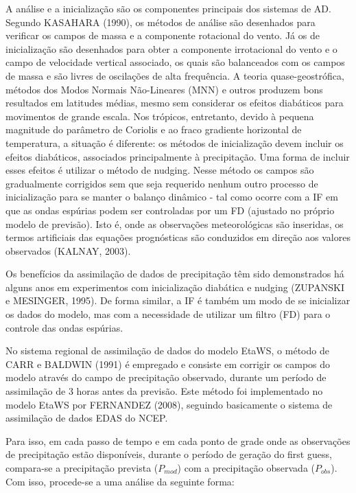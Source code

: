 A análise e a inicialização são os componentes principais dos sistemas de AD. Segundo KASAHARA (1990), os métodos de análise são desenhados para verificar os campos de massa e a componente rotacional do vento. Já os de inicialização são desenhados para obter a componente irrotacional do vento e o campo de velocidade vertical associado, os quais são balanceados com os campos de massa e são livres de oscilações de alta frequência. A teoria quase-geostrófica, métodos dos Modos Normais Não-Lineares (MNN) e outros produzem bons resultados em latitudes médias, mesmo sem considerar os efeitos diabáticos para movimentos de grande escala. Nos trópicos, entretanto, devido à pequena magnitude do parâmetro de Coriolis e ao fraco gradiente horizontal de temperatura, a situação é diferente: os métodos de inicialização devem incluir os efeitos diabáticos, associados principalmente à precipitação. Uma forma de incluir esses efeitos é utilizar o método de nudging. Nesse método os campos são gradualmente corrigidos sem que seja requerido nenhum outro processo de inicialização para se manter o balanço dinâmico - tal como ocorre com a IF em que as ondas espúrias podem ser controladas por um FD (ajustado no próprio modelo de previsão). Isto é, onde as observações meteorológicas são inseridas, os termos artificiais das equações prognósticas são conduzidos em direção aos valores observados (KALNAY, 2003). 

Os benefícios da assimilação de dados de precipitação têm sido demonstrados há alguns anos em experimentos com inicialização diabática e nudging (ZUPANSKI e MESINGER, 1995). De forma similar, a IF é também um modo de se inicializar os dados do modelo, mas com a necessidade de utilizar um filtro (FD) para o controle das ondas espúrias.

No sistema regional de assimilação de dados do modelo EtaWS, o método de CARR e BALDWIN (1991) é empregado e consiste em corrigir os campos do modelo através do campo de precipitação observado, durante um período de assimilação de 3 horas antes da previsão. Este método foi implementado no modelo EtaWS por FERNANDEZ (2008), seguindo basicamente o sistema de assimilação de dados EDAS do NCEP.

Para isso, em cada passo de tempo e em cada ponto de grade onde as observações de precipitação estão disponíveis, durante o período de geração do first guess, compara-se a precipitação prevista ($P_{mod}$) com a precipitação observada ($P_{obs}$). Com isso, procede-se a uma análise da seguinte forma:

